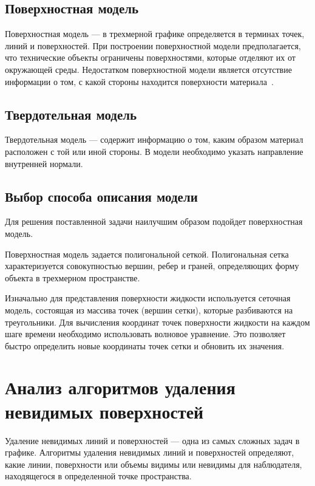 \subsection{Поверхностная модель}
Поверхностная модель --- в трехмерной графике определяется в терминах точек, линий и поверхностей. 
При построении поверхностной модели предполагается, что технические объекты ограничены поверхностями, которые отделяют их от окружающей среды. 
Недостатком поверхностной модели является отсутствие информации о том, с какой стороны находится поверхности материала~\cite{MTM}.

\subsection{Твердотельная модель}
Твердотельная модель --- содержит информацию о том, каким образом материал расположен с той или иной стороны. 
В модели необходимо указать направление внутренней нормали.

\subsection{Выбор способа описания модели}

Для решения поставленной задачи наилучшим образом подойдет поверхностная модель.

Поверхностная модель задается полигональной сеткой. 
Полигональная сетка характеризуется совокупностью вершин, ребер и граней, определяющих форму объекта в трехмерном пространстве.

Изначально для представления поверхности жидкости используется сеточная модель, состоящая из массива точек (вершин сетки), которые разбиваются на треугольники. 
Для вычисления координат точек поверхности жидкости на каждом шаге времени необходимо использовать волновое уравнение. 
Это позволяет быстро определить новые координаты точек сетки и обновить их значения.

\newpage 

\section{Анализ алгоритмов удаления невидимых поверхностей}

Удаление невидимых линий и поверхностей --- одна из самых сложных задач в графике. 
Алгоритмы удаления невидимых линий и поверхностей определяют, какие линии, поверхности или объемы видимы или невидимы для наблюдателя, находящегося в определенной точке пространства.

